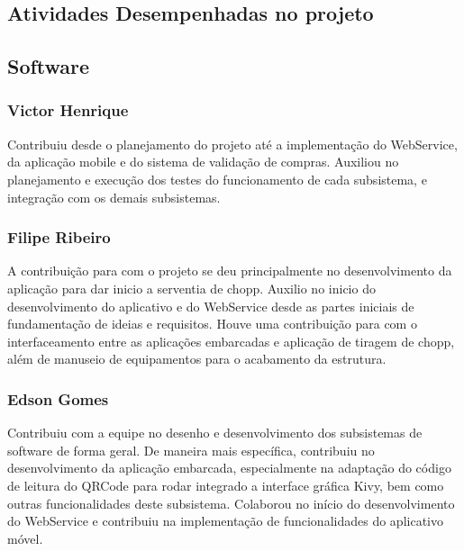 \begin{apendicesenv}

\partapendices

\section{Atividades Desempenhadas no projeto}

\subsection{Software}

\subsubsection{Victor Henrique}

Contribuiu desde o planejamento do projeto até a implementação do WebService, da aplicação mobile
e do sistema de validação de compras. Auxiliou no planejamento e execução dos testes do funcionamento
de cada subsistema, e integração com os demais subsistemas.

\subsubsection{Filipe Ribeiro}

A contribuição para com o projeto se deu principalmente no desenvolvimento da aplicação para dar inicio
a serventia de chopp. Auxilio no inicio do desenvolvimento do aplicativo e do WebService desde as partes
iniciais de fundamentação de ideias e requisitos. Houve uma contribuição para com o interfaceamento entre 
as aplicações embarcadas e aplicação de tiragem de chopp, além de manuseio de equipamentos para o acabamento
da estrutura.

\subsubsection{Edson Gomes}

Contribuiu com a equipe no desenho e desenvolvimento dos subsistemas de software de forma geral.
De maneira mais específica, contribuiu no desenvolvimento da aplicação embarcada, especialmente na adaptação 
do código de leitura do QRCode para rodar integrado a interface gráfica Kivy, bem como outras funcionalidades
deste subsistema. Colaborou no início do desenvolvimento do WebService e contribuiu na implementação de
funcionalidades do aplicativo móvel.


\end{apendicesenv}
